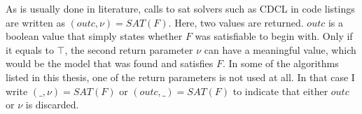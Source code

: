 As is usually done in literature, calls to sat solvers such as CDCL in code listings are written as $(outc,\nu) = SAT(F)$. Here, two values are returned. $outc$ is a boolean value that simply states whether $F$ was satisfiable to begin with. Only if it equals to $\top$, the second return parameter $\nu$ can have a meaningful value, which would be the model that was found and satisfies $F$. In some of the algorithms listed in this thesis, one of the return parameters is not used at all. In that case I write $(\_,\nu) = SAT(F)$ or $(outc,\_) = SAT(F)$ to indicate that either $outc$ or $\nu$ is discarded.